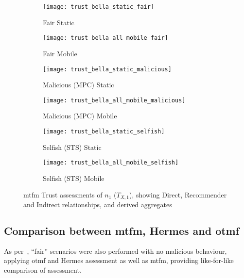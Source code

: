 \begin{figure}[h]
	\centering
	\begin{subfigure}{0.5\textwidth}
		\caption{Fair Static}
		\texttt{[image: trust\_bella\_static\_fair]} 
		\label{fig:trust_static}
	\end{subfigure}%
	\begin{subfigure}{0.5\textwidth}
		\caption{Fair Mobile}
		\texttt{[image: trust\_bella\_all\_mobile\_fair]}  
		\label{fig:trust_all_mobile}
	\end{subfigure}%
	
	\begin{subfigure}{0.5\textwidth}
		\caption{Malicious (MPC) Static}
		\texttt{[image: trust\_bella\_static\_malicious]} 
		\label{fig:trust_static_mal}
	\end{subfigure}%
	\begin{subfigure}{0.5\textwidth}
		\caption{Malicious (MPC) Mobile}
		\texttt{[image: trust\_bella\_all\_mobile\_malicious]}  
		\label{fig:trust_all_mobile_mal}
	\end{subfigure}%
	
	\begin{subfigure}{0.5\textwidth}
		\caption{Selfish (STS) Static}
		\texttt{[image: trust\_bella\_static\_selfish]}
		\label{fig:trust_static_sel}
	\end{subfigure}%
	\begin{subfigure}{0.5\textwidth}
		\caption{Selfish (STS) Mobile}
		\texttt{[image: trust\_bella\_all\_mobile\_selfish]}  \label{fig:trust_all_mobile_sel}
	\end{subfigure}%
	
	\caption{\gls{mtfm} Trust assessments of $n_1$ ($T_{X,1}$), showing Direct, Recommender and Indirect relationships, and derived aggregates} 
	\label{fig:trust_mobility}
\end{figure}
%

\subsection{Comparison between \gls{mtfm}, Hermes and \gls{otmf}}
As per~\citet{Guo11}, ``fair'' scenarios were also performed with no malicious behaviour, applying \gls{otmf} and Hermes assessment as well as \gls{mtfm}, providing like-for-like comparison of assessment.


